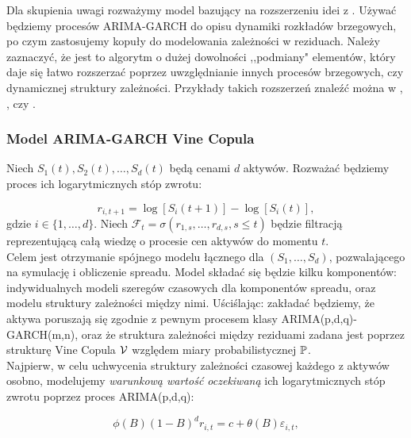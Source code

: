 Dla skupienia uwagi rozważymy model bazujący na rozszerzeniu idei z \cite{Herath_Copula_Crack_Spread}. Używać będziemy procesów ARIMA-GARCH do opisu dynamiki rozkładów brzegowych, po czym zastosujemy kopuły do modelowania zależności w reziduach. Należy zaznaczyć, że jest to algorytm o dużej dowolności ,,podmiany" elementów, który daje się łatwo rozszerzać poprzez uwzględnianie innych procesów brzegowych, czy dynamicznej struktury zależności. Przykłady takich rozszerzeń znaleźć można w \cite{Espen_Crack_Spread_Copula}, \cite{Herath_Copula_Crack_Spread}, \cite{Sukcharoen2017} czy  \cite{Bernard_Pricing_Multivariate_Options_with_copulae}.\\

\subsubsection{Model ARIMA-GARCH Vine Copula}
Niech $S_1(t), S_2(t), \dots, S_d(t)$ będą cenami $d$ aktywów. Rozważać będziemy proces ich logarytmicznych stóp zwrotu:

\begin{equation}
	r_{i, t+1} = \log[S_i(t+1)] - \log[S_i(t)],
	\label{eq:logreturn}
\end{equation}
gdzie $i\in\{1,\dots, d\}$. Niech $\mathcal{F}_t = \sigma(r_{1,s}, \dots, r_{d,s}, s\leqslant t)$ będzie filtracją reprezentującą całą wiedzę o procesie cen aktywów do momentu $t$.\\

Celem jest otrzymanie spójnego modelu łącznego dla $(S_1, \dots, S_d)$, pozwalającego na symulację i obliczenie spreadu. Model składać się będzie kilku komponentów: indywidualnych modeli szeregów czasowych dla komponentów spreadu, oraz modelu struktury zależności między nimi. Uściślając: zakładać będziemy, że aktywa poruszają się zgodnie z pewnym procesem klasy ARIMA(p,d,q)-GARCH(m,n), oraz że struktura zależności między reziduami zadana jest poprzez strukturę Vine Copula $\mathcal{V}$ względem miary probabilistycznej $\mathbb{P}$.\\

Najpierw, w celu uchwycenia struktury zależności czasowej każdego z aktywów osobno, modelujemy \emph{warunkową wartość oczekiwaną} ich logarytmicznych stóp zwrotu poprzez proces ARIMA(p,d,q):

\begin{equation}
	\phi(B)(1-B)^d r_{i, t} = c + \theta(B)\varepsilon_{i, t},
	\label{eq:arima_part}
\end{equation}

